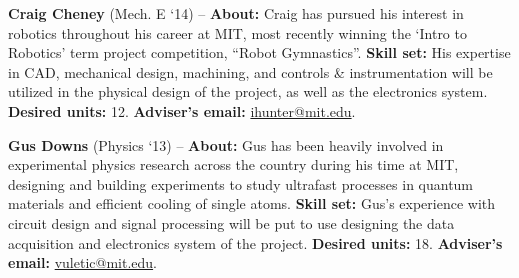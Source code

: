 \documentclass[8pt]{article}
\begin{document}
\vspace{.25cm}

\noindent \textbf{Craig Cheney} (Mech. E `14) -- \textbf{About:} Craig has
pursued his interest in robotics throughout his career at MIT, most recently
winning the `Intro to Robotics' term project competition, ``Robot Gymnastics''.
\textbf{Skill set:} His expertise in CAD, mechanical design, machining, and
controls \& instrumentation will be utilized in the physical design of the
project, as well as the electronics system. \textbf{Desired units:} 12.
\textbf{Adviser's email:} \href{mailto:ihunter@mit.edu}{ihunter@mit.edu}.

\vspace{.25cm}

\noindent \textbf{Gus Downs} (Physics `13) -- \textbf{About:} Gus has been
heavily involved in experimental physics research across the country during his
time at MIT, designing and building experiments to study ultrafast processes in
quantum materials and efficient cooling of single atoms. \textbf{Skill set:}
Gus's experience with circuit design and signal processing will be put to use
designing the data acquisition and electronics system of the project.
\textbf{Desired units:} 18.  \textbf{Adviser's email:}
\href{mailto:vuletic@mit.edu}{vuletic@mit.edu}.
\end{document}
